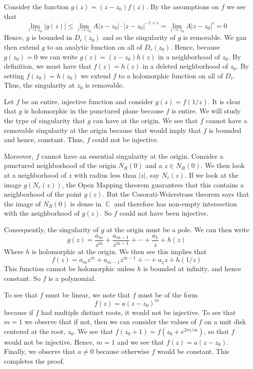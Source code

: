 \documentclass{article}
\DeclareMathOperator{\C}{\mathbb{C}}
\newcommand{\exercise}[1]{\noindent{\textbf{Exercise #1:}}}
\begin{document}
\exercise{3.8.13}

Consider the function $g(z) = (z-z_0)f(z)$. By the assumptions on $f$
we see that
\[
\lim_{z\to z_0} |g(z)| \leq \lim_{z\to z_0}
A|z-z_0|\cdot|z-z_0|^{-1+\epsilon} = \lim_{z\to z_0}A|z-z_0|^{\epsilon} = 0
\]
Hence, $g$ is bounded in $D_r(z_0)$ and so the singularity of $g$ is
removable. We gan then extend $g$ to an analytic function on all of
$D_r(z_0)$. Hence, because $g(z_0) = 0$ we can write $g(z) =
(z-z_0)h(z)$ in a neighborhood of $z_0$. By definition, we must have
that $f(z) = h(z)$ in a deleted neighborhood of $z_0$. By setting
$f(z_0) = h(z_0)$ we extend $f$ to a holomorphic function on all of
$D_r$. Thus, the singularity at $z_0$ is removable.

\exercise{3.8.14}

Let $f$ be an entire, injective function and consider $g(z) =
f(1/z)$. It is clear that $g$ is holomorphic in the punctured plane
because $f$ is entire. We will study the type of singularity that $g$
can have at the origin. We see that $f$ cannot have a removable
singularity at the origin because that would imply that $f$ is bounded
and hence, constant. Thus, $f$ could not be injective.

Moreover, $f$ cannot have an essential singularity at the
origin. Consider a punctured neighborhood of the origin $N_R(0)$ and a
$z \in N_R(0)$. We then look at a neighborhood of $z$ with radius less
than $|z|$, say $N_r(z)$. If we look at the image $g(N_r(z))$, the
Open Mapping theorem guarantees that this contains a neighborhood of
the point $g(z)$. But the Casorati-Weierstrass theorem says that the
image of $N_R(0)$ is dense in $\C$ and therefore has non-empty
intersection with the neighborhood of $g(z)$. So $f$ could not have
been injective.

Consequently, the singularity of $g$ at the origin must be a pole. We
can then write
\[
g(z) = \frac{a_m}{z^m} + \frac{a_{m-1}}{z^{m-1}} + \cdots +
\frac{a_1}{z} + h(z)
\]
Where $h$ is holomorphic at the origin. We then see this implies that
\[
f(z) = a_mz^m + a_{m-1}z^{m-1} + \cdots + a_1z + h(1/z)
\]
This function cannot be holomorphic unless $h$ is bounded at infinity,
and hence constant. So $f$ is a polynomial.

To see that $f$ must be linear, we note that $f$ must be of the form
\[
f(z) = a(z-z_0)^m
\]
because if $f$ had multiple distinct roots, it would not be
injective. To see that $m = 1$ we observe that if not, then we can
consider the values of $f$ on a unit disk centered at the root,
$z_0$. We see that $f(z_0 + 1) = f(z_0 + e^{2\pi i/m})$, so that $f$
would not be injective. Hence, $m = 1$ and we see that $f(z) = a(z -
z_0)$. Finally, we observe that $a \neq 0$ because otherwise $f$ would
be constant. This completes the proof.
\end{document}
